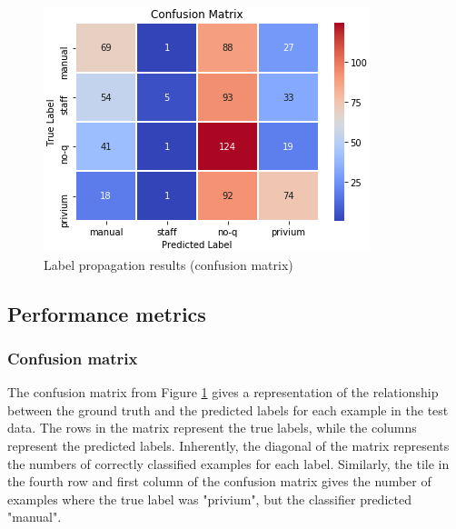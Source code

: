\begin{figure}[H]
    \centering
    \includegraphics[width=.5\textwidth]{Pictures/label_prop_confusion.png}
    \caption{Label propagation results (confusion matrix)}
    \label{fig:label_prop:confusion_matrix}
\end{figure}
\pagebreak

\subsection{Performance metrics}
\label{section:performance_metrics}
\subsubsection{Confusion matrix}
The confusion matrix from Figure \ref{fig:label_prop:confusion_matrix} gives a representation of the relationship between the ground truth and the predicted labels for each example in the test data. The rows in the matrix represent the true labels, while the columns represent the predicted labels. Inherently, the diagonal of the matrix represents the numbers of correctly classified examples for each label. Similarly, the tile in the fourth row and first column of the confusion matrix gives the number of examples where the true label was "privium", but the classifier predicted "manual".

